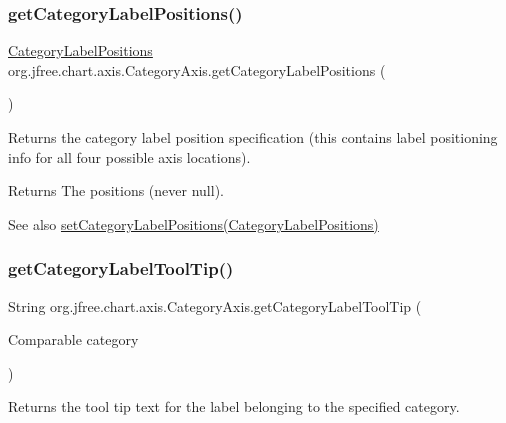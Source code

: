 \subsubsection{\texorpdfstring{get\+Category\+Label\+Positions()}{getCategoryLabelPositions()}}
{\footnotesize\ttfamily \mbox{\hyperlink{classorg_1_1jfree_1_1chart_1_1axis_1_1_category_label_positions}{Category\+Label\+Positions}} org.\+jfree.\+chart.\+axis.\+Category\+Axis.\+get\+Category\+Label\+Positions (\begin{DoxyParamCaption}{ }\end{DoxyParamCaption})}

Returns the category label position specification (this contains label positioning info for all four possible axis locations).

\begin{DoxyReturn}{Returns}
The positions (never {\ttfamily null}).
\end{DoxyReturn}
\begin{DoxySeeAlso}{See also}
\mbox{\hyperlink{classorg_1_1jfree_1_1chart_1_1axis_1_1_category_axis_a6124e85b8233331b9cae0ee9d7c98e4b}{set\+Category\+Label\+Positions(\+Category\+Label\+Positions)}} 
\end{DoxySeeAlso}
\mbox{\label{classorg_1_1jfree_1_1chart_1_1axis_1_1_category_axis_a394246317f649ea4082d3b279101cb1d}} 
\subsubsection{\texorpdfstring{get\+Category\+Label\+Tool\+Tip()}{getCategoryLabelToolTip()}}
{\footnotesize\ttfamily String org.\+jfree.\+chart.\+axis.\+Category\+Axis.\+get\+Category\+Label\+Tool\+Tip (\begin{DoxyParamCaption}\item[{Comparable}]{category }\end{DoxyParamCaption})}

Returns the tool tip text for the label belonging to the specified category.


